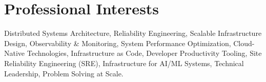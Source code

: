 
\section{Professional Interests}
\footnotesize{Distributed Systems Architecture, Reliability Engineering, Scalable Infrastructure Design, Observability & Monitoring,
    System Performance Optimization, Cloud-Native Technologies, Infrastructure as Code, Developer Productivity Tooling,
    Site Reliability Engineering (SRE), Infrastructure for AI/ML Systems, Technical Leadership, Problem Solving at Scale.}